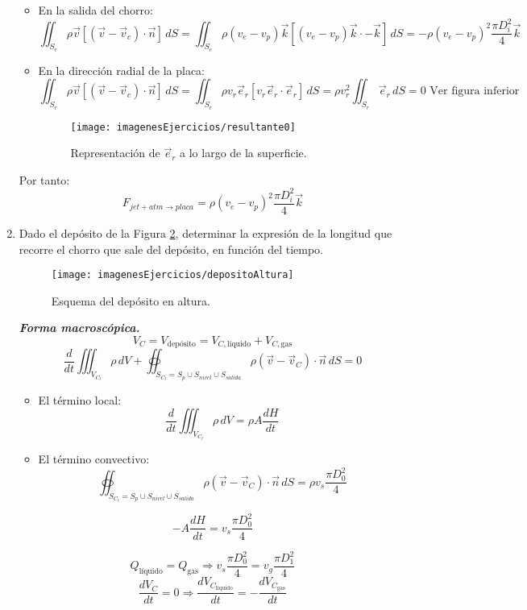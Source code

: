 \begin{enumerate}
{	\begin{itemize}
		\item En la salida del chorro:
			\[\iint_{S_e}\rho\vec{v}\left[\left(\vec{v}-\vec{v}_c\right)\cdot\vec{n}\right]\,dS=
			\iint_{S_e}\rho \left(v_e-v_p\right) \vec{k}\left[\left(v_e-v_p\right) \vec{k}\cdot-\vec{k}\right]\,dS=-\rho\left(v_e-v_p\right)^2\frac{\pi D^2_i}{4}\vec{k}\]
		\item En la dirección radial de la placa:
			\[\iint_{S_r}\rho\vec{v}\left[\left(\vec{v}-\vec{v}_c\right)\cdot\vec{n}\right]\,dS=
			\iint_{S_r}\rho v_r \vec{e}_r\left[v_r \vec{e}_r\cdot\vec{e}_r\right]\,dS=\rho v^2_r\iint_{S_r}\vec{e}_r\,dS=0 \text{ Ver figura inferior}\]
		\begin{figure}[H]
			\centering
			\texttt{[image: imagenesEjercicios/resultante0]}
			\caption{Representación de $\vec{e}_r$ a lo largo de la superficie.}
			\label{fig:resultante0}
		\end{figure}
	\end{itemize}
	Por tanto:
		\[F_{jet+atm\rightarrow placa}=\rho\left(v_e-v_p\right)^2\frac{\pi D^2_i}{4}\vec{k}\]
}
\item Dado el depósito de la Figura \ref{fig:depositoaltura}, determinar la expresión de la longitud que recorre el chorro que sale del depósito, en función del tiempo.
\begin{figure}[H]
	\centering
	\texttt{[image: imagenesEjercicios/depositoAltura]}
	\caption{Esquema del depósito en altura.}
	\label{fig:depositoaltura}
\end{figure}

\blue
\textit{\textbf{Forma macroscópica.}}
\[V_C = V_{\text{depósito}} = V_{C, \text{líquido}} + V_{C, \text{gas}}\]
\[\dfrac{d}{dt} \iiint_{V_{C_l}} \rho\,dV + \oiint_{S_{C_l} = S_p \cup S_{nivel} \cup S_{salida}} \rho (\vec{v}-\vec{v}_C) \cdot \vec{n}\,dS=0\]

\begin{itemize}
	\item El término local:
	\[\dfrac{d}{dt} \iiint_{V_{C_l}} \rho\,dV = \rho A \dfrac{dH}{dt}\]
	\item El término convectivo:
	\[\oiint_{S_{C_l} = S_p \cup S_{nivel} \cup S_{salida}} \rho (\vec{v}-\vec{v}_C) \cdot \vec{n}\,dS=\rho v_s \dfrac{\pi D_0^2}{4}\]
\end{itemize}

\[-A\dfrac{dH}{dt} = v_s\dfrac{\pi D_0^2}{4}\]

\[Q_{\text{líquido}} = Q_{\text{gas}} \Rightarrow v_s\dfrac{\pi D_0^2}{4} = v_g\dfrac{\pi D_1^2}{4}\]
\[\dfrac{dV_C}{dt} = 0 \Rightarrow \dfrac{dV_{C_{\text{líquido}}}}{dt} = -\dfrac{dV_{C_{\text{gas}}}}{dt}\]


\end{enumerate}
